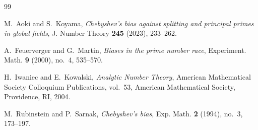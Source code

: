 \documentclass[12pt,reqno]{amsart}
\theoremstyle{definition}
\theoremstyle{remark}
\numberwithin{equation}{section}
\begin{document}
\begin{thebibliography}{99}

M.~Aoki and S.~Koyama,
\textit{ Chebyshev's bias against splitting and principal primes in global ﬁelds},
J. Number Theory \textbf{245} (2023), 233–262.

A.~Feuerverger and G.~Martin,
\textit{Biases in the prime number race},
Experiment. Math. \textbf{9} (2000), no.~4, 535--570.

H.~Iwaniec and E.~Kowalski,
\textit{Analytic Number Theory},
American Mathematical Society Colloquium Publications, vol.~53, American Mathematical Society, Providence, RI, 2004.

M.~Rubinstein and P.~Sarnak,
\textit{Chebyshev's bias},
Exp. Math. \textbf{2} (1994), no.~3, 173--197.

\end{thebibliography}
\end{document}
